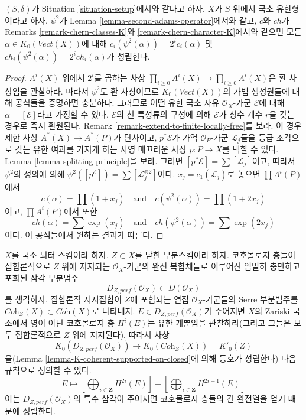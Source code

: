 \begin{lemma}
\label{lemma-adams-and-chern}
$(S, \delta)$가 Situation \ref{situation-setup}에서와 같다고 하자.
$X$가 $S$ 위에서 국소 유한형이라고 하자. $\psi^2$가 Lemma
\ref{lemma-second-adams-operator}에서와 같고, $c$와 $ch$가 Remarks
\ref{remark-chern-classes-K}와 \ref{remark-chern-character-K}에서와
같으면 모든 $\alpha \in K_0(\textit{Vect}(X))$에 대해
$c_i(\psi^2(\alpha)) = 2^i c_i(\alpha)$ 및
$ch_i(\psi^2(\alpha)) = 2^i ch_i(\alpha)$가 성립한다.
\end{lemma}

\begin{proof}
$A^i(X)$ 위에서 $2^i$를 곱하는 사상
$\prod_{i \geq 0} A^i(X) \to \prod_{i \geq 0} A^i(X)$은 환 사상임을
관찰하라. 따라서 $\psi^2$도 환 사상이므로
$K_0(\textit{Vect}(X))$의 가법 생성원들에 대해 공식들을 증명하면
충분하다. 그러므로 어떤 유한 국소 자유 $\mathcal{O}_X$-가군
$\mathcal{E}$에 대해 $\alpha = [\mathcal{E}]$라고 가정할 수 있다.
$\mathcal{E}$의 천 특성류의 구성에 의해 $\mathcal{E}$가 상수 계수
$r$을 갖는 경우로 즉시 환원된다. Remark
\ref{remark-extend-to-finite-locally-free}를 보라. 이 경우 제한 사상
$A^*(X) \to A^*(P)$가 단사이고, $p^*\mathcal{E}$가 가역
$\mathcal{O}_P$-가군 $\mathcal{L}_j$들을 등급 조각으로 갖는 유한
여과를 가지게 하는 사영 매끄러운 사상 $p : P \to X$를 택할 수 있다.
Lemma \ref{lemma-splitting-principle}을 보라. 그러면
$[p^*\mathcal{E}] = \sum [\mathcal{L}_j]$이고, 따라서 $\psi^2$의 정의에 의해
$\psi^2([p^\mathcal{E}]) = \sum [\mathcal{L}_j^{\otimes 2}]$이다.
$x_j  = c_1(\mathcal{L}_j)$로 놓으면 $\prod A^i(P)$에서
$$
c(\alpha) = \prod (1 + x_j)
\quad\text{and}\quad
c(\psi^2(\alpha)) = \prod (1 + 2 x_j)
$$
이고, $\prod A^i(P)$에서 또한
$$
ch(\alpha) = \sum \exp(x_j)
\quad\text{and}\quad
ch(\psi^2(\alpha)) = \sum \exp(2 x_j)
$$
이다. 이 공식들에서 원하는 결과가 따른다.
\end{proof}

\begin{remark}
\label{remark-perf-Z-cohomology-K}
$X$를 국소 뇌터 스킴이라 하자. $Z \subset X$를 닫힌 부분스킴이라
하자. 코호몰로지 층들이 집합론적으로 $Z$ 위에 지지되는
$\mathcal{O}_X$-가군의 완전 복합체들로 이루어진 엄밀히 충만하고
포화된 삼각 부분범주
$$
D_{Z, perf}(\mathcal{O}_X) \subset D(\mathcal{O}_X)
$$
를 생각하자. 집합론적 지지집합이 $Z$에 포함되는 연접
$\mathcal{O}_X$-가군들의 Serre 부분범주를
$\textit{Coh}_Z(X) \subset \textit{Coh}(X)$로 나타내자.
$E \in D_{Z, perf}(\mathcal{O}_X)$가 주어지면 $X$의 Zariski 국소에서
영이 아닌 코호몰로지 층 $H^i(E)$는 유한 개뿐임을 관찰하라(그리고
그들은 모두 집합론적으로 $Z$ 위에 지지된다). 따라서 사상
$$
K_0(D_{Z, perf}(\mathcal{O}_X))
\longrightarrow
K_0(\textit{Coh}_Z(X)) = K'_0(Z)
$$
을(Lemma \ref{lemma-K-coherent-supported-on-closed}에 의해 등호가
성립한다) 다음 규칙으로 정의할 수 있다.
$$
E \longmapsto
[\bigoplus\nolimits_{i \in \mathbf{Z}} H^{2i}(E)] -
[\bigoplus\nolimits_{i \in \mathbf{Z}} H^{2i + 1}(E)]
$$
이는 $D_{Z, perf}(\mathcal{O}_X)$의 특수 삼각이 주어지면 코호몰로지
층들의 긴 완전열을 얻기 때문에 성립한다.
\end{remark}

